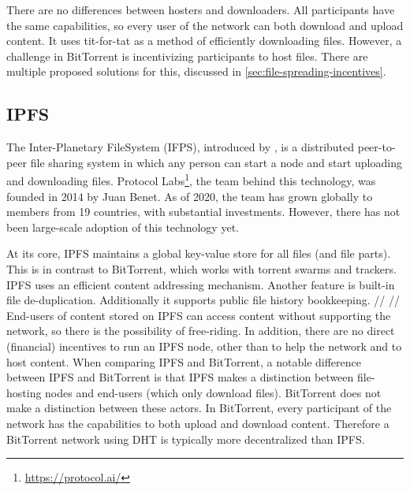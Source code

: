 
There are no differences between hosters and downloaders. All participants have the same capabilities, so every user of the network can both download and upload content. It uses tit-for-tat as a method of efficiently downloading files. However, a challenge in BitTorrent is incentivizing participants to host files. There are multiple proposed solutions for this, discussed in \ref{sec:file-spreading-incentives}. 
\subsection{IPFS}
The Inter-Planetary FileSystem (IFPS), introduced by \cite{benet2014ipfs}, is a distributed peer-to-peer file sharing system in which any person can start a node and start uploading and downloading files. Protocol Labs\footnote{\url{https://protocol.ai/}}, the team behind this technology, was founded in 2014 by Juan Benet. As of 2020, the team has grown globally to members from 19 countries, with substantial investments. However, there has not been large-scale adoption of this technology yet.


At its core, IPFS maintains a global key-value store for all files (and file parts). This is in contrast to BitTorrent, which works with torrent swarms and trackers. IPFS uses an efficient content addressing mechanism. Another feature is built-in file de-duplication. Additionally it supports public file history bookkeeping.
//
//
End-users of content stored on IPFS can access content without supporting the network, so there is the possibility of free-riding. In addition, there are no direct (financial) incentives to run an IPFS node, other than to help the network and to host content. 
When comparing IPFS and BitTorrent, a notable difference between IPFS and BitTorrent is that IPFS makes a distinction between file-hosting nodes and end-users (which only download files). BitTorrent does not make a distinction between these actors. In BitTorrent, every participant of the network has the capabilities to both upload and download content. Therefore a BitTorrent network using DHT is typically more decentralized than IPFS. 

